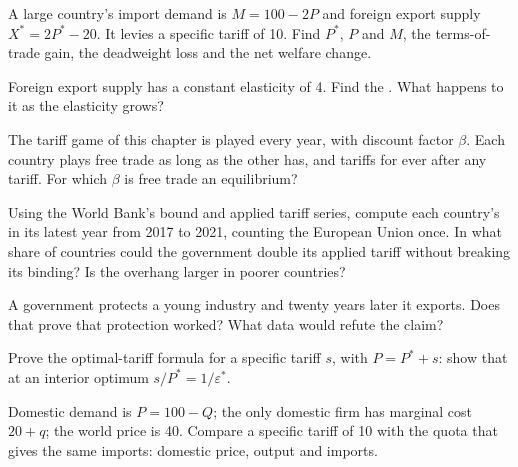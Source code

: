 \begin{exercise}[$\star\star$]\label{exo:b3:trade-policy:5}
A large country's import demand is $M = 100 - 2P$ and foreign export supply $X^* = 2P^*
- 20$. It levies a specific tariff of 10. Find $P^*$, $P$ and $M$, the terms-of-trade
gain, the deadweight loss and the net welfare change.
\end{exercise}

\begin{exercise}[$\star\star$]\label{exo:b3:trade-policy:6}
Foreign export supply has a constant elasticity of 4. Find the .
What happens to it as the elasticity grows?
\end{exercise}

\begin{exercise}[$\star\star$]\label{exo:b3:trade-policy:7}
The tariff game of this chapter is played every year, with discount factor $\beta$.
Each country plays free trade as long as the other has, and tariffs for ever after
any tariff. For which $\beta$ is free trade an equilibrium?
\end{exercise}

\begin{exercise}[$\star\star$]\label{exo:b3:trade-policy:8}
Using the World Bank's bound and applied tariff series, compute each country's
 in its latest year from 2017 to 2021, counting the European Union
once. In what share of countries could the government double its applied tariff
without breaking its binding? Is the overhang larger in poorer countries?
\end{exercise}

\begin{exercise}[$\star\star$]\label{exo:b3:trade-policy:9}
A government protects a young industry and twenty years later it exports. Does that
prove that protection worked? What data would refute the claim?
\end{exercise}

\begin{exercise}[$\star\star\star$]\label{exo:b3:trade-policy:10}
Prove the optimal-tariff formula for a specific tariff $s$, with $P = P^* + s$: show
that at an interior optimum $s/P^* = 1/\varepsilon^*$.
\end{exercise}

\begin{exercise}[$\star\star\star$]\label{exo:b3:trade-policy:11}
Domestic demand is $P = 100 - Q$; the only domestic firm has marginal cost $20 + q$; the
world price is 40. Compare a specific tariff of 10 with the quota that gives the
same imports: domestic price, output and imports.
\end{exercise}

